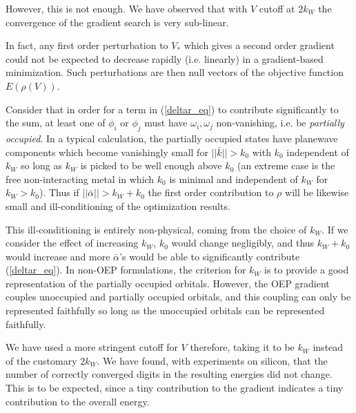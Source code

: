 \documentclass{article}
\newcommand{\Vscp}{V}
\begin{document}
However, this is not enough.  We have observed that with $\Vscp$ cutoff
at $2 k_W$ the convergence of the gradient search is very sub-linear.

In fact, any first order perturbation to $\Vscp_*$ which gives a
second order gradient could not be expected to decrease rapidly
(i.e. linearly) in a gradient-based minimization.  Such perturbations
are then null vectors of the objective function $E(\rho(\Vscp))$.

Consider that in order for a term in (\ref{deltar_eq}) to contribute
significantly to the sum, at least one of $\phi_i$ or $\phi_j$ must
have $\omega_i,\omega_j$ non-vanishing, i.e. be {\em partially
occupied}.  In a typical calculation, the partially occupied states
have planewave components which become vanishingly small for
$||\bar{k}|| > k_0$ with $k_0$ independent of $k_{W}$ so long as
$k_{W}$ is picked to be well enough above $k_0$ (an extreme case is
the free non-interacting metal in which $k_{0}$ is minimal and
independent of $k_W$ for $k_W > k_0$).  Thus if $||\bar{\alpha}|| >
k_{W}+k_{0}$ the first order contribution to $\rho$ will be likewise
small and ill-conditioning of the optimization results.

This ill-conditioning is entirely non-physical, coming from the choice
of $k_W$.  If we consider the effect of increasing $k_{W}$, $k_{0}$
would change negligibly, and thus $k_W + k_0$ would increase and more
$\bar{\alpha}$'s would be able to significantly contribute
(\ref{deltar_eq}).  In non-OEP formulations, the criterion for $k_W$
is to provide a good representation of the partially occupied
orbitals.  However, the OEP gradient couples unoccupied and partially
occupied orbitals, and this coupling can only be represented
faithfully so long as the unoccupied orbitals can be represented
faithfully.

We have used a more stringent cutoff for $\Vscp$ therefore, taking it
to be $k_W$ instead of the customary $2 k_W$.  We have found, with
experiments on silicon, that the number of correctly converged digits
in the resulting energies did not change.  This is to be expected,
since a tiny contribution to the gradient indicates a tiny
contribution to the overall energy.


%
%
\end{document}
